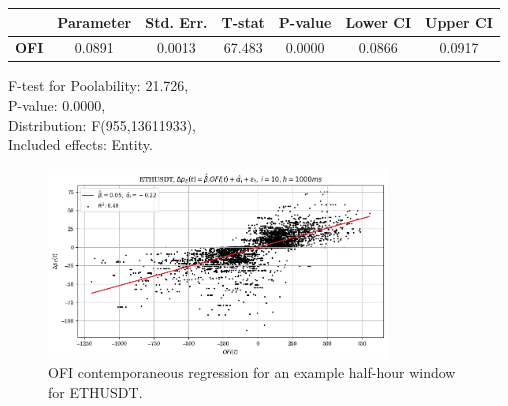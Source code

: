 \documentclass[a4paper, oneside, notitlepage]{book}
\begin{document}
\begin{table}
\begin{center}
\begin{tabular}{lclc}
\hline
\end{tabular}
\begin{tabular}{lcccccc}
             & \textbf{Parameter} & \textbf{Std. Err.} & \textbf{T-stat} & \textbf{P-value} & \textbf{Lower CI} & \textbf{Upper CI}  \\
\hline
\textbf{OFI} &       0.0891       &       0.0013       &      67.483     &      0.0000      &       0.0866      &       0.0917       \\
\hline
\end{tabular}
\end{center}
F-test for Poolability: 21.726, \\
P-value: 0.0000, \\
Distribution: F(955,13611933), \\
Included effects: Entity.
\end{table}

\begin{figure}[htpb]
    \centering
    \includegraphics[width=0.8\textwidth]{./images/ethusdt_h=1000ms_contemp_OFI.png}
    \caption{OFI contemporaneous regression for an example half-hour window for ETHUSDT.}
\end{figure}
\clearpage
\end{document}
